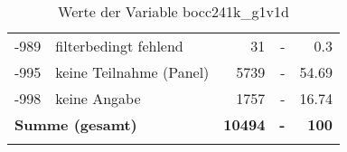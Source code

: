 \begin{longtable}{Xlrrr}
       -989 & filterbedingt fehlend & \num{31} & - & \num[round-mode=places,round-precision=2]{0.3} \\

       -995 & keine Teilnahme (Panel) & \num{5739} & - & \num[round-mode=places,round-precision=2]{54.69} \\

       -998 & keine Angabe & \num{1757} & - & \num[round-mode=places,round-precision=2]{16.74} \\

     \midrule
     \multicolumn{2}{l}{\textbf{Summe (gesamt)}} & \textbf{\num{10494}} & \textbf{-} & \textbf{\num{100}} \\
     \bottomrule
     \caption{Werte der Variable bocc241k\_g1v1d}
     \end{longtable}
     
